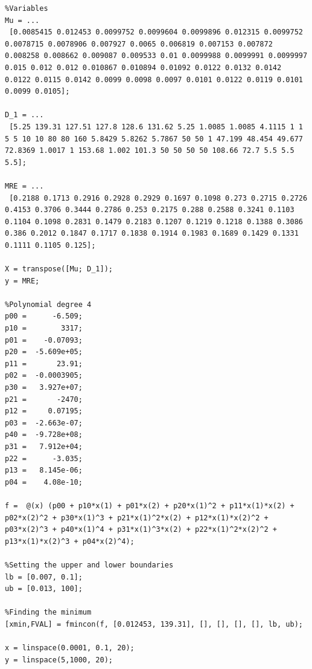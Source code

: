 \begin{lstlisting}
%Variables
Mu = ...
 [0.0085415 0.012453 0.0099752 0.0099604 0.0099896 0.012315 0.0099752 0.0078715 0.0078906 0.007927 0.0065 0.006819 0.007153 0.007872 0.008258 0.008662 0.009087 0.009533 0.01 0.0099988 0.0099991 0.0099997 0.015 0.012 0.012 0.010867 0.010894 0.01092 0.0122 0.0132 0.0142 0.0122 0.0115 0.0142 0.0099 0.0098 0.0097 0.0101 0.0122 0.0119 0.0101 0.0099 0.0105];

D_1 = ...
 [5.25 139.31 127.51 127.8 128.6 131.62 5.25 1.0085 1.0085 4.1115 1 1 5 5 10 10 80 80 160 5.8429 5.8262 5.7867 50 50 1 47.199 48.454 49.677 72.8369 1.0017 1 153.68 1.002 101.3 50 50 50 50 108.66 72.7 5.5 5.5 5.5];

MRE = ...
 [0.2188 0.1713 0.2916 0.2928 0.2929 0.1697 0.1098 0.273 0.2715 0.2726 0.4153 0.3706 0.3444 0.2786 0.253 0.2175 0.288 0.2588 0.3241 0.1103 0.1104 0.1098 0.2831 0.1479 0.2183 0.1207 0.1219 0.1218 0.1388 0.3086 0.386 0.2012 0.1847 0.1717 0.1838 0.1914 0.1983 0.1689 0.1429 0.1331 0.1111 0.1105 0.125];

X = transpose([Mu; D_1]);
y = MRE;

%Polynomial degree 4
p00 =      -6.509;
p10 =        3317;
p01 =    -0.07093;
p20 =  -5.609e+05;
p11 =       23.91;
p02 =  -0.0003905;
p30 =   3.927e+07;
p21 =       -2470;
p12 =     0.07195;
p03 =  -2.663e-07;
p40 =  -9.728e+08;
p31 =   7.912e+04;
p22 =      -3.035;
p13 =   8.145e-06; 
p04 =    4.08e-10;

f =  @(x) (p00 + p10*x(1) + p01*x(2) + p20*x(1)^2 + p11*x(1)*x(2) + p02*x(2)^2 + p30*x(1)^3 + p21*x(1)^2*x(2) + p12*x(1)*x(2)^2 + p03*x(2)^3 + p40*x(1)^4 + p31*x(1)^3*x(2) + p22*x(1)^2*x(2)^2 + p13*x(1)*x(2)^3 + p04*x(2)^4);

%Setting the upper and lower boundaries
lb = [0.007, 0.1];
ub = [0.013, 100];

%Finding the minimum
[xmin,FVAL] = fmincon(f, [0.012453, 139.31], [], [], [], [], lb, ub);

x = linspace(0.0001, 0.1, 20);
y = linspace(5,1000, 20);
\end{lstlisting}